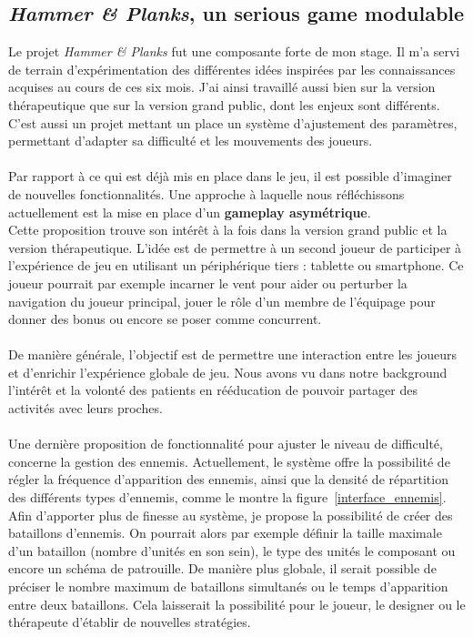 	\subsection{\emph{Hammer \& Planks}, un serious game modulable}
Le projet \emph{Hammer \& Planks} fut une composante forte de mon stage. Il m'a servi de terrain d'expérimentation des différentes idées inspirées par les connaissances acquises au cours de ces six mois. J'ai ainsi travaillé aussi bien sur la version thérapeutique que sur la version grand public, dont les enjeux sont différents. C'est aussi un projet mettant un place un système d'ajustement des paramètres, permettant d'adapter sa difficulté et les mouvements des joueurs.

	\paragraph{}Par rapport à ce qui est déjà mis en place dans le jeu, il est possible d'imaginer de nouvelles fonctionnalités. Une approche à laquelle nous réfléchissons actuellement est la mise en place d'un \textbf{gameplay asymétrique}. \\
Cette proposition trouve son intérêt à la fois dans la version grand public et la version thérapeutique. L'idée est de permettre à un second joueur de participer à l'expérience de jeu en utilisant un périphérique tiers : tablette ou smartphone. Ce joueur pourrait par exemple incarner le vent pour aider ou perturber la navigation du joueur principal, jouer le rôle d'un membre de l'équipage pour donner des bonus ou encore se poser comme concurrent. 

\paragraph{}De manière générale, l'objectif est de permettre une interaction entre les joueurs et d'enrichir l'expérience globale de jeu. Nous avons vu dans notre background l'intérêt et la volonté des patients en rééducation de pouvoir partager des activités avec leurs proches.

\paragraph{} Une dernière proposition de fonctionnalité pour ajuster le niveau de difficulté, concerne la gestion des ennemis. Actuellement, le système offre la possibilité de régler la fréquence d'apparition des ennemis, ainsi que la densité de répartition des différents types d'ennemis, comme le montre la figure~\ref{interface_ennemis}. \\
Afin d'apporter plus de finesse au système, je propose la possibilité de créer des bataillons d'ennemis. On pourrait alors par exemple définir la taille maximale d'un bataillon (nombre d'unités en son sein), le type des unités le composant ou encore un schéma de patrouille. De manière plus globale, il serait possible de préciser le nombre maximum de bataillons simultanés ou le temps d'apparition entre deux bataillons. Cela laisserait la possibilité pour le joueur, le designer ou le thérapeute d'établir de nouvelles stratégies. 

